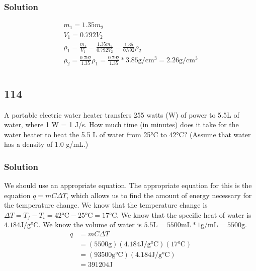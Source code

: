 \documentclass[11pt]{report}
\begin{document}
\subsection{Solution}
\begin{gather}
    m_1 = 1.35 m_2\\
    V_1 = 0.792 V_2\\
    \rho_1 = \frac{m_1}{V_1} = \frac{1.35 m_2}{0.792 V_2} = \frac{1.35}{0.792}\rho_2\\
    \rho_2 = \frac{0.792}{1.35}\rho_1 = \frac{0.792}{1.35}*3.85 \unit{\gram/\centi\meter^3} = \boxed{2.26 \unit{\gram/\centi\meter^3}}
\end{gather}

\pagebreak

\chapter{}
\section{114}
A portable electric water heater transfers 255 watts (W) of power to 5.5L of water, where 1 W = 1 J/s. How much time (in minutes) does it take for the water heater to heat the 5.5 L of water from 25\unit{\celsius} to 42\unit{\celsius}? (Assume that water has a density of 1.0 \unit{\gram/\milli\liter}.) 

\subsection{Solution}
We should use an appropriate equation. 
The appropriate equation for this is the equation $q = mC\Delta T$, which allows us to find the amount of energy necessary for the temperature change.
We know that the temperature change is $\Delta T = T_f - T_i = 42\unit{\celsius} - 25\unit{\celsius} = 17\unit{\celsius}$.
We know that the specific heat of water is $4.184\unit{\joule/\gram\celsius}$.
We know the volume of water is $5.5\unit{\liter} = 5500\unit{\milli\liter} * 1\unit{\gram/\milli\liter} = 5500\unit{\gram}$.
\begin{align*}
    q   &=  mC\Delta T\\
        &=  (5500\unit{\gram})(4.184\unit{\joule/\gram\celsius})(17\unit{\celsius})\\
        &=  (93500\unit{\gram\celsius})(4.184\unit{\joule/\gram\celsius})\\
        &=  391204\unit{\joule}
\end{align*}
\end{document}
